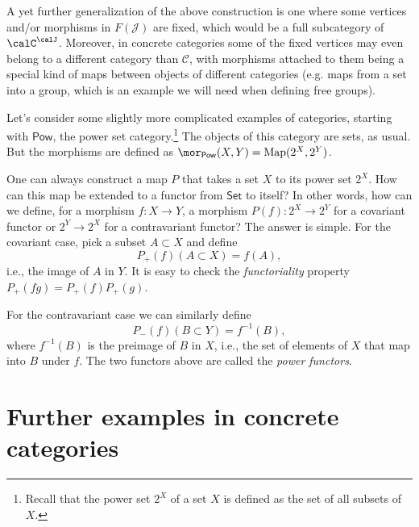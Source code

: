 %
\begin{example}
    A yet further generalization of the above construction is one where
    some vertices and/or morphisms in $F\left(\mathcal{J}\right)$ are
    fixed, which would be a full subcategory of $\calC^\calJ$.
    Moreover, in concrete categories some of the fixed vertices may even
    belong to a different category than $\mathcal{C}$, with morphisms
    attached to them being a special kind of maps between objects of different
    categories (e.g. maps from a set into a group, which is an example
    we will need when defining free groups).
\end{example}
%
\begin{example}
    Let's consider some slightly more complicated examples of categories,
    starting with $\mathsf{Pow}$, the power set category.\footnote{Recall that the power set $2^{X}$ of a set $X$ is defined as the
    set of all subsets of $X$.} The objects of this category are sets, as usual. But the morphisms
    are defined as $\mor_{\mathsf{Pow}}(X,Y)=\text{Map}(2^{X},2^{Y})$.

    One can always construct a map $P$ that takes a set $X$ to its power
    set $2^{X}$. How can this map be extended to a functor from $\mathsf{Set}$
    to itself? In other words, how can we define, for a morphism $f:X\rightarrow Y$,
    a morphism $P(f):2^{X}\rightarrow2^{Y}$ for a covariant functor or
    $2^{Y}\rightarrow2^{X}$ for a contravariant functor? The answer is
    simple. For the covariant case, pick a subset $A\subset X$ and define
    \begin{equation}
    P_{+}(f)(A\subset X)=f(A),
    \end{equation}
    i.e., the image of $A$ in $Y$. It is easy to check the \emph{functoriality}
    property $P_{+}\left(fg\right)=P_{+}\left(f\right)P_{+}\left(g\right)$.

    For the contravariant case we can similarly define
    \begin{equation}
        P_{-}(f)(B\subset Y)=f^{-1}(B),
    \end{equation}
    where $f^{-1}(B)$ is the preimage of $B$ in $X$, i.e., the set
    of elements of $X$ that map into $B$ under $f$. The two functors
    above are called the \emph{power functors}.
\end{example}

\section{Further examples in concrete categories}

